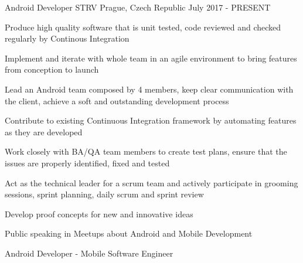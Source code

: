 

\begin{cventries}

  \cventry
    {Android Developer}
    {STRV}
    {Prague, Czech Republic}
    {July 2017 - PRESENT}
    {
      \begin{cvitems}
        \item {Produce high quality software that is unit tested, code reviewed and checked regularly by Continous Integration}
        \item {Implement and iterate with whole team in an agile environment to bring features from conception to launch}
        \item {Lead an Android team composed by 4 members, keep clear communication with the client, achieve a soft and outstanding development process}
        \item {Contribute to existing Continuous Integration framework by automating features as they are developed}
        \item {Work closely with BA/QA team members to create test plans, ensure that the issues are properly identified, fixed and tested}
        \item {Act as the technical leader for a scrum team and actively participate in grooming sessions, sprint planning, daily scrum and sprint review}
        \item {Develop proof concepts for new and innovative ideas}
        \item {Public speaking in Meetups about Android and Mobile Development}
      \end{cvitems}
      \begin{cvsubentries}
      \end{cvsubentries}
    }
  \cventry
    {Android Developer - Mobile Software Engineer}

\end{cventries}
